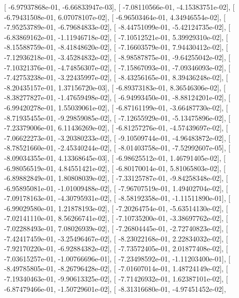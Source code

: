\documentclass{article}
\begin{document}
       [ -6.97937868e-01,  -6.66833947e-03],
       [ -7.08110566e-01,  -4.15383751e-02],
       [ -6.79431508e-01,   6.07078107e-02],
       [ -6.96503464e-01,   4.34946554e-02],
       [ -7.95253789e-01,  -6.79684833e-02],
       [ -8.44751099e-01,  -5.42124735e-02],
       [ -6.83869162e-01,  -1.11946718e-02],
       [ -7.10512521e-01,   5.39929310e-02],
       [ -8.15588759e-01,  -8.41848620e-02],
       [ -7.16603579e-01,   7.94430412e-02],
       [ -7.12936218e-01,  -3.45284832e-02],
       [ -8.98587875e-01,  -9.64255042e-02],
       [ -7.10321376e-01,  -4.74856307e-02],
       [ -7.15867093e-01,  -7.09346093e-02],
       [ -7.42753238e-01,  -3.22435997e-02],
       [ -8.43256165e-01,   8.39436248e-02],
       [ -8.20435157e-01,   1.37156720e-03],
       [ -6.89373183e-01,   8.36546306e-02],
       [ -8.38277827e-01,  -1.47659498e-02],
       [ -6.94993450e-01,  -8.88124201e-02],
       [ -6.99420278e-01,   1.55039061e-02],
       [ -6.87161199e-01,  -3.66487730e-02],
       [ -8.71935455e-01,  -9.29859085e-02],
       [ -7.12655929e-01,  -5.13475896e-02],
       [ -7.23379006e-01,   6.11436269e-02],
       [ -6.81257276e-01,  -4.57439697e-02],
       [ -7.06622273e-01,  -3.20380233e-02],
       [ -9.10509744e-01,  -4.96483872e-02],
       [ -8.78521660e-01,  -2.45340244e-02],
       [ -8.01403758e-01,  -7.52992607e-05],
       [ -8.09034355e-01,   4.13368645e-03],
       [ -6.98625512e-01,   1.46791405e-02],
       [ -6.98056519e-01,   4.84551421e-02],
       [ -6.80170014e-01,   5.81065803e-02],
       [ -6.89882849e-01,   1.80808039e-02],
       [ -7.33125787e-01,  -9.84258348e-02],
       [ -6.95895081e-01,  -1.01009488e-02],
       [ -7.96707519e-01,   1.49402704e-02],
       [ -7.09178163e-01,  -4.30795931e-02],
       [ -8.58192358e-01,  -1.11511890e-01],
       [ -6.99029580e-01,   1.21878193e-02],
       [ -7.20264754e-01,  -5.63514130e-02],
       [ -7.02141110e-01,   8.56266741e-02],
       [ -7.10735200e-01,  -3.38697762e-02],
       [ -7.02288493e-01,   7.08026939e-02],
       [ -7.26804445e-01,  -2.72740823e-02],
       [ -7.42417459e-01,  -3.25496467e-02],
       [ -8.23022168e-01,   2.22834032e-02],
       [ -7.92170220e-01,  -6.92884382e-02],
       [ -7.73572405e-01,   2.01877408e-02],
       [ -7.03615257e-01,  -1.00766696e-01],
       [ -7.23498592e-01,  -1.11203400e-01],
       [ -8.49785805e-01,  -8.26796428e-02],
       [ -7.01607014e-01,   1.48724149e-02],
       [ -7.19340463e-01,  -9.90613325e-02],
       [ -7.71426932e-01,   1.62387101e-02],
       [ -6.87479466e-01,  -1.50729601e-02],
       [ -8.31316680e-01,  -4.97451452e-02],
\end{document}

